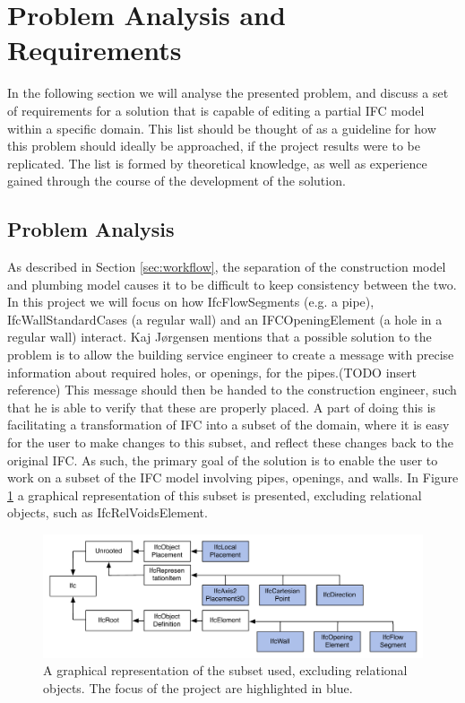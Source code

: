 \section{Problem Analysis and Requirements}
In the following section we will analyse the presented problem, and discuss a set of requirements for a solution that is capable of editing a partial IFC model within a specific domain. This list should be thought of as a guideline for how this problem should ideally be approached, if the project results were to be replicated. The list is formed by theoretical knowledge, as well as experience gained through the course of the development of the solution.

\subsection{Problem Analysis}
\label{subsec:problem_analysis}
As described in Section \ref{sec:workflow}, the separation of the construction model and plumbing model causes it to be difficult to keep consistency between the two. In this project we will focus on how IfcFlowSegments (e.g. a pipe), IfcWallStandardCases (a regular wall) and an IFCOpeningElement (a hole in a regular wall) interact. Kaj Jørgensen mentions that a possible solution to the problem is to allow the building service engineer to create a message with precise information about required holes, or openings, for the pipes.(TODO insert reference) This message should then be handed to the construction engineer, such that he is able to verify that these are properly placed. A part of doing this is facilitating a transformation of IFC into a subset of the domain, where it is easy for the user to make changes to this subset, and reflect these changes back to the original IFC. As such, the primary goal of the solution is to enable the user to work on a subset of the IFC model involving pipes, openings, and walls. In Figure \ref{fig:ifcheirachy} a graphical representation of this subset is presented, excluding relational objects, such as IfcRelVoidsElement.

\begin{figure}[t]
    \centering
        \includegraphics[width=120mm]{images/IfcHeirachy.pdf}
    \caption{A graphical representation of the subset used, excluding relational objects. The focus of the project are highlighted in blue.}
    \label{fig:ifcheirachy}
\end{figure}

